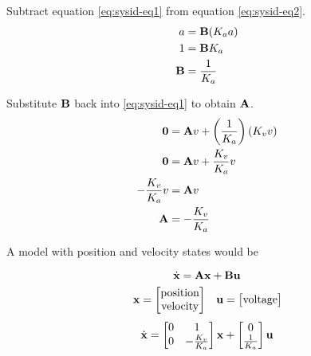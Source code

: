 Subtract equation \eqref{eq:sysid-eq1} from equation \eqref{eq:sysid-eq2}.
\begin{align*}
  a &= \mathbf{B} (K_a a) \\
  1 &= \mathbf{B} K_a \\
  \mathbf{B} &= \frac{1}{K_a}
\end{align*}

Substitute $\mathbf{B}$ back into \eqref{eq:sysid-eq1} to obtain $\mathbf{A}$.
\begin{align*}
  \mathbf{0} &= \mathbf{A}v + \left(\frac{1}{K_a}\right)(K_v v) \\
  \mathbf{0} &= \mathbf{A}v + \frac{K_v}{K_a} v \\
  -\frac{K_v}{K_a} v &= \mathbf{A}v \\
  \mathbf{A} &= -\frac{K_v}{K_a}
\end{align*}

A model with position and velocity states would be
\begin{theorem}
  \begin{equation*}
    \dot{\mathbf{x}} = \mathbf{A}\mathbf{x} + \mathbf{B}\mathbf{u}
  \end{equation*}
  \begin{equation*}
    \begin{array}{cc}
    \mathbf{x} =
      \begin{bmatrix}
        \text{position} \\
        \text{velocity}
      \end{bmatrix} &
    \mathbf{u} =
      \begin{bmatrix}
        \text{voltage}
      \end{bmatrix}
    \end{array}
  \end{equation*}
  \begin{equation}
    \dot{\mathbf{x}} =
      \begin{bmatrix}
        0 & 1 \\
        0 & -\frac{K_v}{K_a}
      \end{bmatrix}
      \mathbf{x} +
      \begin{bmatrix}
        0 \\
        \frac{1}{K_a}
      \end{bmatrix}
      \mathbf{u}
  \end{equation}
\end{theorem}

